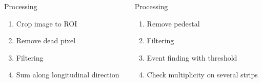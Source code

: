 \begin{frame}
\begin{columns}[T]
\begin{column}{0.45\textwidth}
    \end{column}
  \end{columns}
  \begin{columns}[T]
    \begin{column}{0.45\textwidth}
      \begin{block}{Processing}
        \begin{enumerate}
          \item Crop image to ROI
          \item Remove dead pixel
          \item Filtering
          \item Sum along longitudinal direction
        \end{enumerate}
      \end{block}
    \end{column}
    \begin{column}{0.45\textwidth}
      \begin{block}{Processing}
        \begin{enumerate}
          \item Remove pedestal
          \item Filtering
          \item Event finding with threshold
          \item Check multiplicity on several strips
        \end{enumerate}
      \end{block}
    \end{column}
  \end{columns}
\end{frame}

